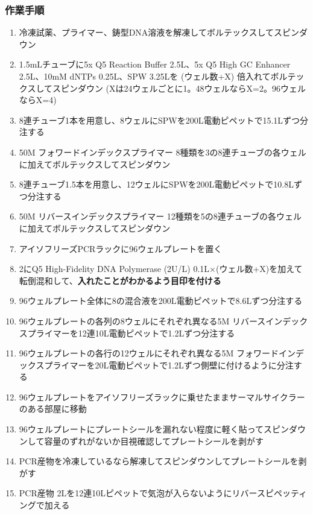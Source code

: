 \documentclass[titlepage,10pt,a4paper]{jsbook}
\begin{document}
\subsubsection{作業手順}
\begin{enumerate}
\item 冷凍試薬、プライマー、鋳型DNA溶液を解凍してボルテックスしてスピンダウン
\item 1.5mLチューブに5x Q5 Reaction Buffer 2.5{\textmu}L、5x Q5 High GC Enhancer 2.5{\textmu}L、10mM dNTPs 0.25{\textmu}L、SPW 3.25{\textmu}Lを (ウェル数+X) 倍入れてボルテックスしてスピンダウン (Xは24ウェルごとに1。48ウェルならX=2。96ウェルならX=4)
\item 8連チューブ1本を用意し、8ウェルにSPWを200{\textmu}L電動ピペットで15.1{\textmu}Lずつ分注する
\item 50{\textmu}M フォワードインデックスプライマー 8種類を3の8連チューブの各ウェルに加えてボルテックスしてスピンダウン
\item 8連チューブ1.5本を用意し、12ウェルにSPWを200{\textmu}L電動ピペットで10.8{\textmu}Lずつ分注する
\item 50{\textmu}M リバースインデックスプライマー 12種類を5の8連チューブの各ウェルに加えてボルテックスしてスピンダウン
\item アイソフリーズPCRラックに96ウェルプレートを置く
\item 2にQ5 High-Fidelity DNA Polymerase (2U/{\textmu}L) 0.1{\textmu}L×(ウェル数+X)を加えて転倒混和して、\textbf{入れたことがわかるよう目印を付ける}
\item 96ウェルプレート全体に8の混合液を200{\textmu}L電動ピペットで8.6{\textmu}Lずつ分注する
\item 96ウェルプレートの各列の8ウェルにそれぞれ異なる5{\textmu}M リバースインデックスプライマーを12連10{\textmu}L電動ピペットで1.2{\textmu}Lずつ分注する
\item 96ウェルプレートの各行の12ウェルにそれぞれ異なる5{\textmu}M フォワードインデックスプライマーを20{\textmu}L電動ピペットで1.2{\textmu}Lずつ側壁に付けるように分注する
\item 96ウェルプレートをアイソフリーズラックに乗せたままサーマルサイクラーのある部屋に移動
\item 96ウェルプレートにプレートシールを漏れない程度に軽く貼ってスピンダウンして容量のずれがないか目視確認してプレートシールを剥がす
\item PCR産物を冷凍しているなら解凍してスピンダウンしてプレートシールを剥がす
\item PCR産物 2{\textmu}Lを12連10{\textmu}Lピペットで気泡が入らないようにリバースピペッティングで加える

\end{enumerate}
\end{document}
